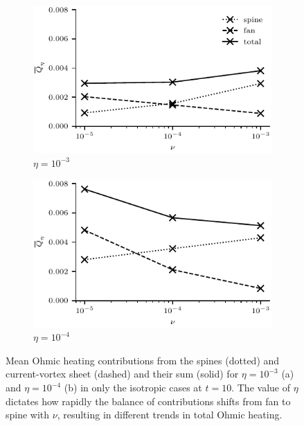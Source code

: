 \begin{figure}[t]
  \begin{subfigure}{0.49\textwidth}
      \centering
  \includegraphics[width=1.0\linewidth]{param_study/balance_of_ohmic_heating-3.pdf}
      \caption{$\eta = 10^{-3}$}%
      \label{fig:balance_of_ohmic_heating-3}
    \end{subfigure}
    \hfill
    \begin{subfigure}{0.49\textwidth}
      \centering
  \includegraphics[width=1.0\linewidth]{param_study/balance_of_ohmic_heating-4.pdf}
      \caption{$\eta = 10^{-4}$}%
      \label{fig:balance_of_ohmic_heating-4}
    \end{subfigure}
  \caption{Mean Ohmic heating contributions from the spines (dotted) and current-vortex sheet (dashed) and their sum (solid) for $\eta=10^{-3}$ (a) and $\eta=10^{-4}$ (b) in only the isotropic cases at $t=10$. The value of $\eta$ dictates how rapidly the balance of contributions shifts from fan to spine with $\nu$, resulting in different trends in total Ohmic heating.}%
  \label{fig:balance_of_ohmic_heating}
\end{figure}

